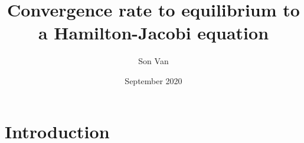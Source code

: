 \documentclass{article}
\title{Convergence rate to equilibrium to a Hamilton-Jacobi equation}
\author{Son Van}
\date{September 2020}
\begin{document}
\maketitle

\section{Introduction}
\end{document}
